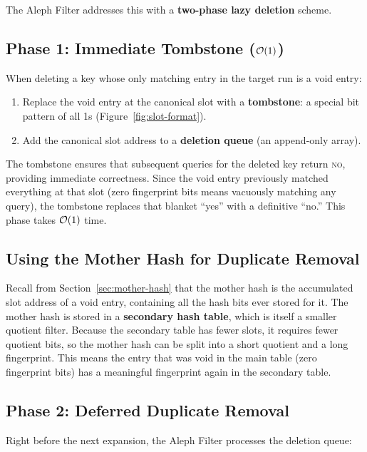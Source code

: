 The Aleph Filter addresses this with a \textbf{two-phase lazy 
deletion} scheme.

\subsection{Phase 1: Immediate Tombstone ($\mathcal{O}(1)$)}

When deleting a key whose only matching entry in the target run is a 
void entry:

\begin{enumerate}
  \item Replace the void entry at the canonical slot with a 
        \textbf{tombstone}: a special bit pattern of all 1s 
        (Figure~\ref{fig:slot-format}).
  \item Add the canonical slot address to a \textbf{deletion queue} 
        (an append-only array).
\end{enumerate}

The tombstone ensures that subsequent queries for the deleted key 
return \textsc{no}, providing immediate correctness. Since the void 
entry previously matched everything at that slot (zero fingerprint 
bits means vacuously matching any query), the tombstone replaces that 
blanket ``yes'' with a definitive ``no.'' This phase takes $\mathcal{O}(1)$ 
time.

\subsection{Using the Mother Hash for Duplicate Removal}

Recall from Section~\ref{sec:mother-hash} that the mother hash is the 
accumulated slot address of a void entry, containing all the hash 
bits ever stored for it. The mother hash is stored in a 
\textbf{secondary hash table}, which is itself a smaller quotient 
filter. Because the secondary table has fewer slots, it requires 
fewer quotient bits, so the mother hash can be split into a short 
quotient and a long fingerprint. This means the entry that was void 
in the main table (zero fingerprint bits) has a meaningful fingerprint 
again in the secondary table.

\subsection{Phase 2: Deferred Duplicate Removal}

Right before the next expansion, the Aleph Filter processes the 
deletion queue:

